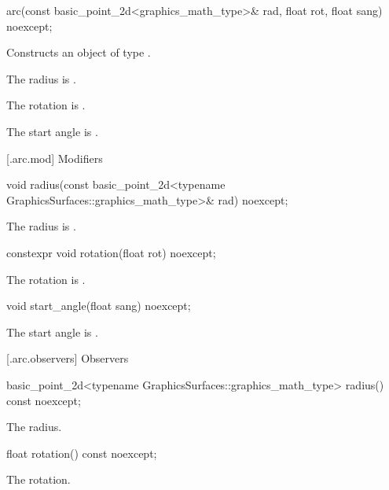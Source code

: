 %
\begin{itemdecl}
arc(const basic_point_2d<graphics_math_type>& rad,
  float rot, float sang) noexcept;
\end{itemdecl}
\begin{itemdescr}
\pnum
\effects
Constructs an object of type .

\pnum
The radius is .

\pnum
The rotation is .

\pnum
The start angle is .
\end{itemdescr}

 [\iotwod.arc.mod] {Modifiers}

%
\begin{itemdecl}
void radius(const basic_point_2d<typename GraphicsSurfaces::graphics_math_type>& rad) noexcept;
\end{itemdecl}
\begin{itemdescr}
\pnum
\effects The radius is .
\end{itemdescr}

%
\begin{itemdecl}
constexpr void rotation(float rot) noexcept;
\end{itemdecl}
\begin{itemdescr}
\pnum
\effects The rotation is .
\end{itemdescr}

%
\begin{itemdecl}
void start_angle(float sang) noexcept;
\end{itemdecl}
\begin{itemdescr}
\pnum
\effects The start angle is .
\end{itemdescr}

 [\iotwod.arc.observers] {Observers}

%
\begin{itemdecl}
basic_point_2d<typename GraphicsSurfaces::graphics_math_type> radius() const noexcept;
\end{itemdecl}
\begin{itemdescr}
\pnum
\returns The radius.
\end{itemdescr}

%
\begin{itemdecl}
float rotation() const noexcept;
\end{itemdecl}
\begin{itemdescr}
\pnum
\returns The rotation.
\end{itemdescr}


